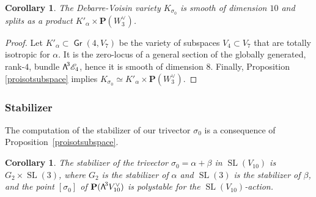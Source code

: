\documentclass[11pt]{article}
\let\mathcal\mathscr
\newtheorem{coro}[lemm]{Corollary}
\theoremstyle{definition}
\renewcommand\P{{\mathbf P}}\let\PP\P
\newcommand\cE{\mathcal{E}}
\DeclareMathOperator{\Gr}{\mathsf{Gr}}
\let\cong\simeq
\DeclareMathOperator{\SL}{SL}
\newcommand\bw[1]{{\hbox{\large$\mathsf{\Lambda}$}^{\!#1}}}
\begin{document}
\begin{coro}\label{corokalphabeta}
The Debarre-Voisin variety
$K_{\sigma_0}$ is smooth of dimension $10$ and splits as a product $K'_\alpha\times \P(W_3^\vee)$.
\end{coro}

\begin{proof} Let $K'_{\alpha}\subset \Gr(4,V_7)$ be the variety of subspaces
$V_4\subset V_7$ that are totally isotropic for $\alpha$. It is the zero-locus of a general section of the globally generated, rank\nobreakdash-$4$, bundle $\bw3\cE_4$, hence it is smooth of dimension $8$. Finally, Proposition
\ref{proisotsubspace} implies $K_{\sigma_0}\cong K'_\alpha\times \P(W_3^\vee)$.
\end{proof}

\subsubsection{Stabilizer}\label{orbetstab2}

The computation of the stabilizer of our trivector $\sigma_0$ is a consequence of Proposition~\ref{proisotsubspace}.

\begin{coro}\label{lestabgenus10}
The stabilizer of the trivector $\sigma_0 =\alpha+\beta$ in
$\SL(V_{10})$ is
$G_2\times \SL(3)$, where $G_2$ is the stabilizer of $\alpha$ and $\SL(3)$ is the stabilizer of $\beta$, and the point $[\sigma_0]$ of $\P(\bw3V_{10}^\vee)$ is polystable for the $\SL(V_{10})$-action.
\end{coro}
\end{document}
